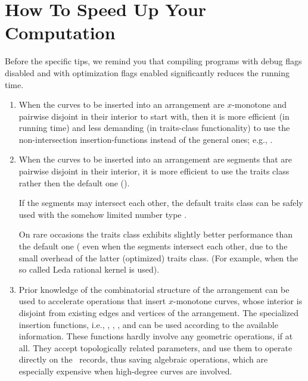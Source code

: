 \section{How To Speed Up Your Computation\label{arr_sec:tips}}
Before the specific tips, we remind you that compiling programs with
debug flags disabled and with optimization flags enabled significantly
reduces the running time.

\begin{enumerate}
\item
When the curves to be inserted into an arrangement are $x$-monotone
and pairwise disjoint in their interior to start with, then it is more
efficient (in running time) and less demanding (in traits-class
functionality) to use the non-intersection insertion-functions instead
of the general ones; e.g., .

\item
When the curves to be inserted into an arrangement are segments that
are pairwise disjoint in their interior, it is more efficient to use
the traits class  rather then
the default one ().

If the segments may intersect each other, the default traits class
 can be safely used with the somehow limited
number type .

On rare occasions the traits class 
exhibits slightly better performance than the default one
(
even when the segments intersect each other, due to the small overhead
of the latter (optimized) traits class. (For example, when the so
called {\sc Leda} rational kernel is used).

\item
Prior knowledge of the combinatorial structure of the arrangement can
be used to accelerate operations that insert $x$-monotone curves,
whose interior is disjoint from existing edges and vertices of the
arrangement. The specialized insertion functions, i.e., 
, , 
, and 
can be used according to the available information. These functions
hardly involve any geometric operations, if at all. They accept
topologically related parameters, and use them to operate directly on
the \dcel\ records, thus saving algebraic operations, which are
especially expensive when high-degree curves are involved.


\end{enumerate}

